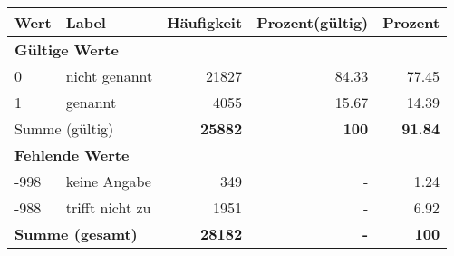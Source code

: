      \begin{longtable}{lXrrr}
     \toprule
     \textbf{Wert} & \textbf{Label} & \textbf{Häufigkeit} & \textbf{Prozent(gültig)} & \textbf{Prozent} \\
     \endhead
     \midrule
     \multicolumn{5}{l}{\textbf{Gültige Werte}}\\

     0 &
     \multicolumn{1}{X}{ nicht genannt   } &


       \num{21827} &
       \num[round-mode=places,round-precision=2]{84.33} &
         \num[round-mode=places,round-precision=2]{77.45} \\

     1 &
     \multicolumn{1}{X}{ genannt   } &


       \num{4055} &
       \num[round-mode=places,round-precision=2]{15.67} &
         \num[round-mode=places,round-precision=2]{14.39} \\
     \midrule
     \multicolumn{2}{l}{Summe (gültig)} &
       \textbf{\num{25882}} &
     \textbf{100} &
       \textbf{\num[round-mode=places,round-precision=2]{91.84}} \\
     \multicolumn{5}{l}{\textbf{Fehlende Werte}}\\
       -998 &
       keine Angabe &
         \num{349} &
        - &
         \num[round-mode=places,round-precision=2]{1.24} \\
       -988 &
       trifft nicht zu &
         \num{1951} &
        - &
         \num[round-mode=places,round-precision=2]{6.92} \\
     \midrule
     \multicolumn{2}{l}{\textbf{Summe (gesamt)}} &
          \textbf{\num{28182}} &
        \textbf{-} &
        \textbf{100} \\
     \bottomrule
     \end{longtable}
     
